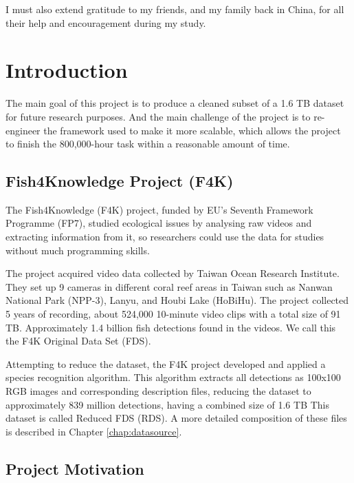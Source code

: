 \documentclass[bsc,frontabs,twoside,fullspacing,parskip,deptreport]{infthesis}
\begin{document}
I must also extend gratitude to my friends, and my family back in China, for all their help and encouragement during my study.

\newpage

\standarddeclaration

\tableofcontents


\chapter{Introduction}


The main goal of this project is to produce a cleaned subset of a 1.6 TB dataset for future research purposes. 
And the main challenge of the project is to re-engineer the framework used to make it more scalable, which allows the project to finish the 800,000-hour task within a reasonable amount of time.

\section{Fish4Knowledge Project (F4K)}

The Fish4Knowledge (F4K) project, funded by EU's Seventh Framework Programme (FP7), studied ecological issues by analysing raw videos and extracting information from it, so researchers could use the data for studies without much programming skills. 

The project acquired video data collected by Taiwan Ocean Research Institute. 
They set up 9 cameras in different coral reef areas in Taiwan such as Nanwan National Park (NPP-3), Lanyu, and Houbi Lake (HoBiHu). 
The project collected 5 years of recording, about 524,000 10-minute video clips with a total size of 91 TB. Approximately 1.4 billion fish detections found in the videos. 
We call this the F4K Original Data Set (FDS). 

Attempting to reduce the dataset, the F4K project developed and applied a species recognition algorithm. 
This algorithm extracts all detections as 100x100 RGB images and corresponding description files, reducing the dataset to approximately 839 million detections, having a combined size of 1.6 TB
This dataset is called Reduced FDS (RDS).
A more detailed composition of these files is described in Chapter \ref{chap:datasource}.

\section{Project Motivation}
\end{document}
